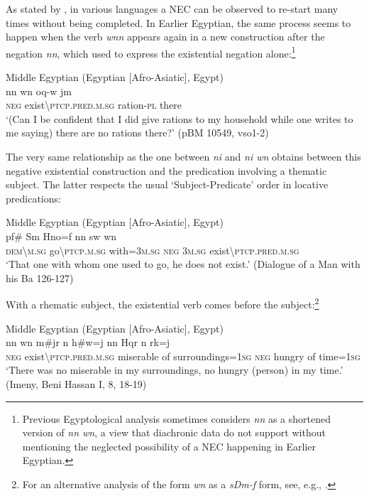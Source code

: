 \documentclass[output=paper]{langsci/langscibook}
\begin{document}
As stated by \citet[174]{Veselinova2016}, in various languages a NEC can be observed to re-start many times without being completed. In Earlier Egyptian, the same process seems to happen when the verb \textit{wnn} appears again in a new construction after the negation \textit{nn}, which used to express the existential negation alone:\footnote{Previous Egyptological analysis sometimes considers \textit{nn} as a shortened version of \textit{nn wn}, a view that diachronic data do not support without mentioning the neglected possibility of a NEC happening in Earlier Egyptian. }  
 
\ea Middle Egyptian (Egyptian [Afro-Asiatic], Egypt) \label{ex:AE37}\\
    \gll nn wn oq-w jm  \\
    \textsc{neg} exist\textbackslash\textsc{ptcp.pred.m.sg} ration-\textsc{pl} there\\ 
    \glt ‘(Can I be confident that I did give rations to my household while one writes to me saying) there are no rations there?’ (pBM 10549, vso1-2) 
\z 
 
The very same relationship as the one between \textit{ni} and \textit{ni wn} obtains between this negative existential construction and the predication involving a thematic subject. The latter respects the usual ‘Subject-Predicate’ order in locative predications: 

\ea Middle Egyptian (Egyptian [Afro-Asiatic], Egypt) \label{ex:AE38}\\
    \gll pf\# Sm Hno=f nn sw wn\\  
    \textsc{dem\textbackslash m.sg} go\textbackslash\textsc{ptcp.m.sg} with=\textsc{3m.sg} \textsc{neg} \textsc{3m.sg} exist\textbackslash\textsc{ptcp.pred.m.sg}\\ 
    \glt ‘That one with whom one used to go, he does not exist.’ (Dialogue of a Man with his Ba 126-127) 
\z 
 
 With a rhematic subject, the existential verb comes before the subject:\footnote{For an alternative analysis of the form \textit{wn} as a \textit{sDm-f} form, see, e.g., \citet{Uljas2013}.}
 
\ea Middle Egyptian (Egyptian [Afro-Asiatic], Egypt) \label{ex:AE39}\\
    \gll nn wn m\#jr n h\#w=j nn Hqr n rk=j\\  
    \textsc{neg} exist\textbackslash\textsc{ptcp.pred.m.sg} miserable of surroundings=\textsc{1sg} \textsc{neg} hungry of time=\textsc{1sg}\\ 
    \glt ‘There was no miserable in my surroundings, no hungry (person) in my time.’ (Imeny, Beni Hassan I, 8, 18-19) 
\z
\end{document}
